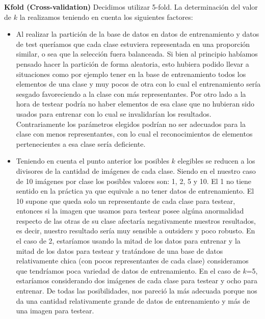 \textbf{Kfold (Cross-validation)}
Decidimos utilizar 5-fold.
La determinación del valor de $k$ la realizamos teniendo en cuenta los siguientes factores:
\begin{itemize}
\item Al realizar la partición de la base de datos en datos de entrenamiento y datos de test queríamos que cada clase estuviera representada en una proporción similar, o sea que la selección fuera balanceada. Si bien al principio habíamos pensado hacer la partición de forma aleatoria, esto hubiera podido llevar a situaciones como por ejemplo tener en la base de entrenamiento todos los elementos de una clase y muy pocos de otra con lo cual el entrenamiento sería sesgado favoreciendo a la clase con más representantes. Por otro lado a la hora de testear podría no haber elementos de esa clase que no hubieran sido usados para entrenar con lo cual se invalidarían los resultados. Contrariamente los parámetros elegidos podrían no ser adecuados para la clase con menos representantes, con lo cual el reconocimientos de elementos pertenecientes a esa clase sería deficiente.

\item Teniendo en cuenta el punto anterior los posibles $k$ elegibles se reducen a los divisores de la cantidad de imágenes de cada clase. Siendo en el nuestro caso de 10 imágenes por clase los posibles valores son: 1, 2, 5 y 10. El 1 no tiene sentido en la práctica ya que equivale a no tener datos de entrenamiento. El 10 supone que queda solo un representante de cada clase para testear, entonces si la imagen que usamos para testear posee algúna anormalidad respecto de las otras de su clase afectaría negativamente nuestros resultados, es decir, nuestro resultado sería muy sensible a outsiders y poco robusto. En el caso de 2, estaríamos usando la mitad de los datos para entrenar y la mitad de los datos para testear y tratándose de una base de datos relativamente chica (con pocos representantes de cada clase) consideramos que tendríamos poca variedad de datos de entrenamiento. En el caso de $k$=5, estaríamos considerando dos imágenes de cada clase para testear y ocho para entrenar. De todas las posibilidades, nos pareció la más adecuada porque nos da una cantidad relativamente grande de datos de entrenamiento y más de una imagen para testear. 
\end{itemize}